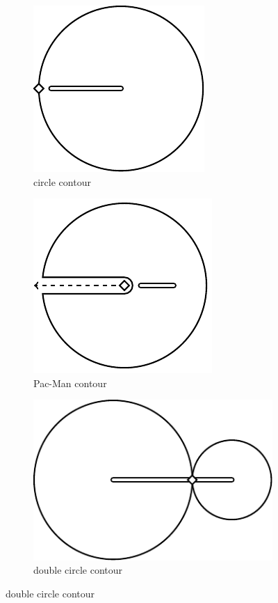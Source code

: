 \begin{figure}[h]
\centering
\begin{subfigure}{.25\textwidth}\centering
\includegraphics[scale=.7]{imgs/ch7_circle_contour.pdf}
\caption{circle contour}
\label{fig:circle}
\end{subfigure}
\hfill
\begin{subfigure}{.25\textwidth}\centering
\includegraphics[scale=.7]{imgs/ch7_pacman_contour.pdf}
\caption{Pac-Man contour}
\label{fig:pacman}
\end{subfigure}
\hfill
\begin{subfigure}{.35\textwidth}\centering
\includegraphics[scale=.7]{imgs/ch7_double_circle_contour.pdf}
\caption{double circle contour}

\end{subfigure}
\end{figure}
